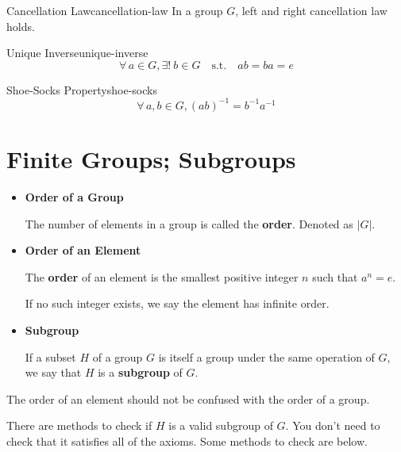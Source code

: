 \documentclass{report}
\let\oldforall\forall
\renewcommand{\forall}{\oldforall \, }
\let\oldexist\exists
\renewcommand{\exists}{\oldexist \: }
\newcommand\existu{\oldexist! \: }
\newcommand{\st}{\quad \mathrm{s.t.} \quad}
\newcommand{\inv}{^{-1}}
\begin{document}
\begin{theo}[colback=red!5!white,colframe=red!50!black]{Cancellation Law}{cancellation-law}
In a group $G$, left and right cancellation law holds.
\end{theo}

\begin{theo}[colback=red!5!white,colframe=red!50!black]{Unique Inverse}{unique-inverse}
\[ \forall a \in G, \existu b \in G \st ab = ba = e\]
\end{theo}

\begin{theo}[colback=red!5!white,colframe=red!50!black]{Shoe-Socks Property}{shoe-socks}
\[ \forall a, b \in G, (ab)\inv = b\inv a\inv \]
\end{theo}

\section{Finite Groups; Subgroups}

\begin{definition}[title={Group and Element Orders}]
\begin{itemize}
  \item \textbf{Order of a Group}
  
  The number of elements in a group is called the \textbf{order}. Denoted as $|G|$.

  \item \textbf{Order of an Element}
  
  The \textbf{order} of an element is the smallest positive integer $n$ such that $a^n = e$.

  If no such integer exists, we say the element has infinite order.

  \item \textbf{Subgroup}
  
  If a subset $H$ of a group $G$ is itself a group under the same operation of $G$,
  we say that $H$ is a \textbf{subgroup} of $G$.
\end{itemize}
\end{definition}

\begin{note}[title={Important Distinction}]
The order of an element should not be confused with the order of a group.
\end{note}

\begin{property}[title={Subgroup Verification}]
There are methods to check if $H$ is a valid subgroup of $G$. You don't need to check that it
satisfies all of the axioms. Some methods to check are below.
\end{property}
\end{document}

